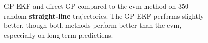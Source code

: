 \begin{figure}
    \centering
    \caption{GP-EKF and direct GP compared to the \acrshort{cvm} method on $350$ random \textbf{straight-line} trajectories. The GP-EKF performs slightly better, though both methods perform better than the \acrshort{cvm}, especcially on long-term predictions.}
    \label{fig:stats_curved_vs_cvm}


\end{figure}
